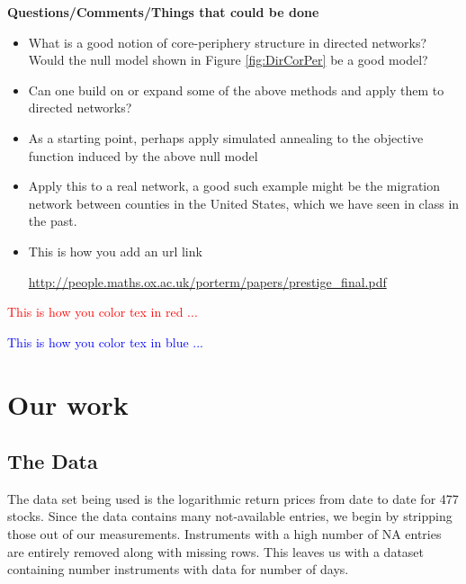 \documentclass[10pt]{siamltex}
\begin{document}
\textbf{Questions/Comments/Things that could be done}
\begin{itemize}
\item What is a good notion of core-periphery structure in directed networks? Would the null model shown in Figure \ref{fig:DirCorPer} be a good model?
\item Can one build on or expand some of the above methods and apply them to directed networks? 
\item As a starting point, perhaps apply simulated annealing to the objective function induced by the above null model
\item Apply this to a real network, a good such example might be the migration network between counties in the United States, which we have seen in class in the past.
\item This is how you add an url link 
 \begin{center}
   \url{http://people.maths.ox.ac.uk/porterm/papers/prestige_final.pdf} 
\end{center}   
\end{itemize}

\textcolor{red}{This is how you color tex in red ...}

\textcolor{blue}{This is how you color tex in blue ...}

\section{Our work}    \label{sec:ourWork}
\subsection{The Data}

The data set being used is the logarithmic return prices from date to date for 477 stocks. Since the data contains many not-available entries, we begin by stripping those out of our measurements. Instruments with a high number of NA entries are entirely removed along with missing rows. This leaves us with a dataset containing number instruments with data for number of days.
\end{document}
